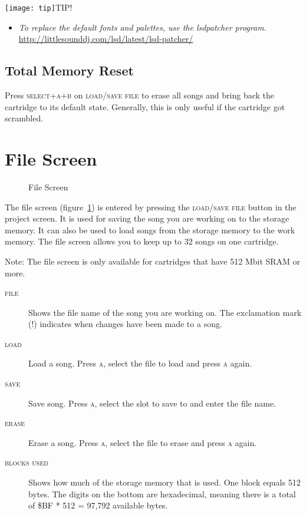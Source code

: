 \texttt{[image: tip]}TIP!
\begin{itemize}
\item \textit{To replace the default fonts and palettes, use the lsdpatcher program.} \url{http://littlesounddj.com/lsd/latest/lsd-patcher/}
\end{itemize}

\subsection{Total Memory Reset}
\label{total-memory-reset}

Press \textsc{select+a+b} on \textsc{load/save file} to erase all songs and bring back the cartridge to its default state.
Generally, this is only useful if the cartridge got scrambled.

\section{File Screen}

\begin{figure}[htpb]
	\begin{center}
	\end{center}
	\caption{File Screen}
	\label{fig:file}
\end{figure}

The file screen (figure~\ref{fig:file}) is entered by pressing the \textsc{load/save file} button in the project screen. It is used for saving the song you are working on to the storage memory. It can also be used to load songs from the storage memory to the work memory. The file screen allows you to keep up to 32 songs on one cartridge.

Note: The file screen is only available for cartridges that have 512 Mbit SRAM or more.

\begin{description}
	\item[\textsc{file}] Shows the file name of the song you are working on. The exclamation mark (\textsc{!}) indicates when changes have been made to a song.
	\item[\textsc{load}] Load a song. Press \textsc{a}, select the file to load and press \textsc{a} again.
	\item[\textsc{save}] Save song. Press \textsc{a}, select the slot to save to and enter the file name.
	\item[\textsc{erase}] Erase a song. Press \textsc{a}, select the file to erase and press \textsc{a} again.
	\item[\textsc{blocks used}] Shows how much of the storage memory that is used. One block equals 512 bytes. The digits on the bottom are hexadecimal, meaning there is a total of \$BF * 512 = 97,792 available bytes.
\end{description}

